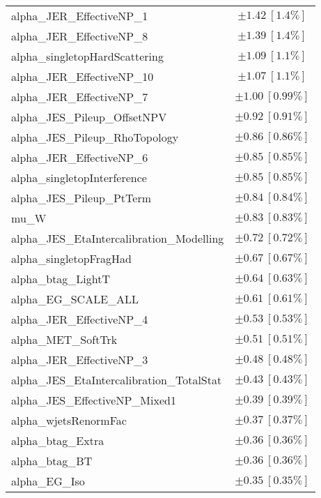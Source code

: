 \begin{table}
\begin{center}
\begin{tabular*}{\textwidth}{@{\extracolsep{\fill}}lc}
alpha\_JER\_EffectiveNP\_1         & $\pm 1.42\ [1.4\%] $       \\
alpha\_JER\_EffectiveNP\_8         & $\pm 1.39\ [1.4\%] $       \\
alpha\_singletopHardScattering         & $\pm 1.09\ [1.1\%] $       \\
alpha\_JER\_EffectiveNP\_10         & $\pm 1.07\ [1.1\%] $       \\
alpha\_JER\_EffectiveNP\_7         & $\pm 1.00\ [0.99\%] $       \\
alpha\_JES\_Pileup\_OffsetNPV         & $\pm 0.92\ [0.91\%] $       \\
alpha\_JES\_Pileup\_RhoTopology         & $\pm 0.86\ [0.86\%] $       \\
alpha\_JER\_EffectiveNP\_6         & $\pm 0.85\ [0.85\%] $       \\
alpha\_singletopInterference         & $\pm 0.85\ [0.85\%] $       \\
alpha\_JES\_Pileup\_PtTerm         & $\pm 0.84\ [0.84\%] $       \\
mu\_W         & $\pm 0.83\ [0.83\%] $       \\
alpha\_JES\_EtaIntercalibration\_Modelling         & $\pm 0.72\ [0.72\%] $       \\
alpha\_singletopFragHad         & $\pm 0.67\ [0.67\%] $       \\
alpha\_btag\_LightT         & $\pm 0.64\ [0.63\%] $       \\
alpha\_EG\_SCALE\_ALL         & $\pm 0.61\ [0.61\%] $       \\
alpha\_JER\_EffectiveNP\_4         & $\pm 0.53\ [0.53\%] $       \\
alpha\_MET\_SoftTrk         & $\pm 0.51\ [0.51\%] $       \\
alpha\_JER\_EffectiveNP\_3         & $\pm 0.48\ [0.48\%] $       \\
alpha\_JES\_EtaIntercalibration\_TotalStat         & $\pm 0.43\ [0.43\%] $       \\
alpha\_JES\_EffectiveNP\_Mixed1         & $\pm 0.39\ [0.39\%] $       \\
alpha\_wjetsRenormFac         & $\pm 0.37\ [0.37\%] $       \\
alpha\_btag\_Extra         & $\pm 0.36\ [0.36\%] $       \\
alpha\_btag\_BT         & $\pm 0.36\ [0.36\%] $       \\
alpha\_EG\_Iso         & $\pm 0.35\ [0.35\%] $       \\

\end{tabular*}
\end{center}
\end{table}
